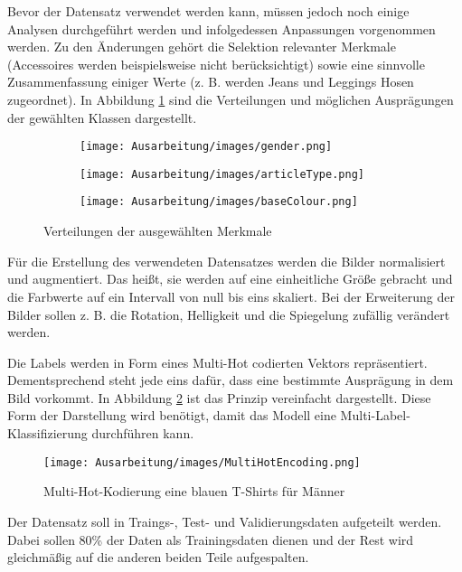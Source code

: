 Bevor der Datensatz verwendet werden kann, müssen jedoch noch einige Analysen durchgeführt werden und infolgedessen Anpassungen vorgenommen werden. Zu den Änderungen gehört die Selektion relevanter Merkmale (Accessoires werden beispielsweise nicht berücksichtigt) sowie eine sinnvolle Zusammenfassung einiger Werte (z. B. werden Jeans und Leggings Hosen zugeordnet). In Abbildung \ref{fig:evaluation} sind die Verteilungen und möglichen Ausprägungen der gewählten Klassen dargestellt.

\begin{figure}[H]
    \centering
    \begin{subfigure}[c]{0.32\linewidth}
        \texttt{[image: Ausarbeitung/images/gender.png]}
    \end{subfigure}
    \begin{subfigure}[c]{0.32\linewidth}
        \texttt{[image: Ausarbeitung/images/articleType.png]}
    \end{subfigure}
    \begin{subfigure}[c]{0.32\linewidth}
        \texttt{[image: Ausarbeitung/images/baseColour.png]}
    \end{subfigure}
    \caption{Verteilungen der ausgewählten Merkmale}
    \label{fig:evaluation}
\end{figure}

Für die Erstellung des verwendeten Datensatzes werden die Bilder normalisiert und augmentiert. Das heißt, sie werden auf eine einheitliche Größe gebracht und die Farbwerte auf ein Intervall von null bis eins skaliert. Bei der Erweiterung der Bilder sollen z. B. die Rotation, Helligkeit und die Spiegelung zufällig verändert werden.

Die Labels werden in Form eines Multi-Hot codierten Vektors repräsentiert. Dementsprechend steht jede eins dafür, dass eine bestimmte Ausprägung in dem Bild vorkommt. In Abbildung \ref{fig:multihot} ist das Prinzip vereinfacht dargestellt. Diese Form der Darstellung wird benötigt, damit das Modell eine Multi-Label-Klassifizierung durchführen kann.

\begin{figure}[H]
    \centering
    \texttt{[image: Ausarbeitung/images/MultiHotEncoding.png]}
    \caption{Multi-Hot-Kodierung eine blauen T-Shirts für Männer}
    \label{fig:multihot}
\end{figure}

Der Datensatz soll in Traings-, Test- und Validierungsdaten aufgeteilt werden. Dabei sollen 80\% der Daten als Trainingsdaten dienen und der Rest wird gleichmäßig auf die anderen beiden Teile aufgespalten.